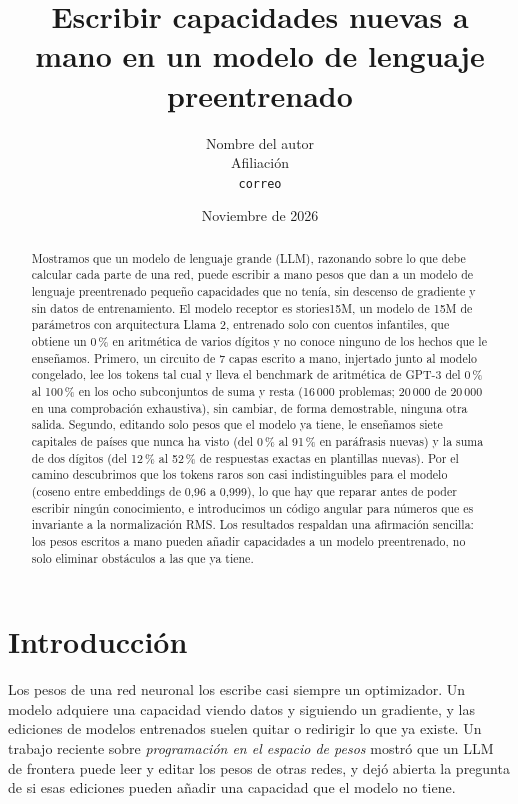 \documentclass[11pt]{article}
\title{Escribir capacidades nuevas a mano en un modelo de lenguaje preentrenado}
\author{Nombre del autor\\ Afiliación\\ \texttt{correo}}
\date{Noviembre de 2026}
\begin{document}
\maketitle

\begin{abstract}
Mostramos que un modelo de lenguaje grande (LLM), razonando sobre lo que debe calcular cada parte de una red, puede escribir a mano pesos que dan a un modelo de lenguaje preentrenado pequeño capacidades que no tenía, sin descenso de gradiente y sin datos de entrenamiento. El modelo receptor es stories15M, un modelo de 15M de parámetros con arquitectura Llama 2, entrenado solo con cuentos infantiles, que obtiene un 0\,\% en aritmética de varios dígitos y no conoce ninguno de los hechos que le enseñamos. Primero, un circuito de 7 capas escrito a mano, injertado junto al modelo congelado, lee los tokens tal cual y lleva el benchmark de aritmética de GPT-3 del 0\,\% al 100\,\% en los ocho subconjuntos de suma y resta (16\,000 problemas; 20\,000 de 20\,000 en una comprobación exhaustiva), sin cambiar, de forma demostrable, ninguna otra salida. Segundo, editando solo pesos que el modelo ya tiene, le enseñamos siete capitales de países que nunca ha visto (del 0\,\% al 91\,\% en paráfrasis nuevas) y la suma de dos dígitos (del 12\,\% al 52\,\% de respuestas exactas en plantillas nuevas). Por el camino descubrimos que los tokens raros son casi indistinguibles para el modelo (coseno entre embeddings de 0,96 a 0,999), lo que hay que reparar antes de poder escribir ningún conocimiento, e introducimos un código angular para números que es invariante a la normalización RMS. Los resultados respaldan una afirmación sencilla: los pesos escritos a mano pueden añadir capacidades a un modelo preentrenado, no solo eliminar obstáculos a las que ya tiene.
\end{abstract}

\section{Introducción}
Los pesos de una red neuronal los escribe casi siempre un optimizador. Un modelo adquiere una capacidad viendo datos y siguiendo un gradiente, y las ediciones de modelos entrenados suelen quitar o redirigir lo que ya existe. Un trabajo reciente sobre \emph{programación en el espacio de pesos} \cite{takehi2026} mostró que un LLM de frontera puede leer y editar los pesos de otras redes, y dejó abierta la pregunta de si esas ediciones pueden añadir una capacidad que el modelo no tiene.
\end{document}

